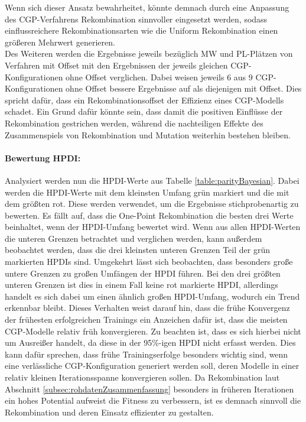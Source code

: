 Wenn sich dieser Ansatz bewahrheitet, könnte demnach durch eine Anpassung des CGP-Verfahrens Rekombination sinnvoller eingesetzt werden, sodass einflussreichere Rekombinationsarten wie die Uniform Rekombination einen größeren Mehrwert generieren.\\
Des Weiteren werden die Ergebnisse jeweils bezüglich MW und PL-Plätzen von Verfahren mit Offset mit den Ergebnissen der jeweils gleichen CGP-Konfigurationen ohne Offset verglichen.
Dabei weisen jeweils 6 aus 9 CGP-Konfigurationen ohne Offset bessere Ergebnisse auf als diejenigen mit Offset.
Dies spricht dafür, dass ein Rekombinationsoffset der Effizienz eines CGP-Modells schadet.
Ein Grund dafür könnte sein, dass damit die positiven Einflüsse der Rekombination gestrichen werden, während die nachteiligen Effekte des Zusammenspiels von Rekombination und Mutation weiterhin bestehen bleiben.
\paragraph{Bewertung HPDI:}
Analysiert werden nun die HPDI-Werte aus Tabelle \ref{table:parityBayesian}.
Dabei werden die HPDI-Werte mit dem kleinsten Umfang grün markiert und die mit dem größten rot.
Diese werden verwendet, um die Ergebnisse stichprobenartig zu bewerten.
Es fällt auf, dass die One-Point Rekombination die besten drei Werte beinhaltet, wenn der HPDI-Umfang bewertet wird.
Wenn aus allen HPDI-Werten die unteren Grenzen betrachtet und verglichen werden, kann außerdem beobachtet werden, dass die drei kleinsten unteren Grenzen Teil der grün markierten HPDIs sind.
Umgekehrt lässt sich beobachten, dass besonders große untere Grenzen zu großen Umfängen der HPDI führen.
Bei den drei größten unteren Grenzen ist dies in einem Fall keine rot markierte HPDI, allerdings handelt es sich dabei um einen ähnlich großen HPDI-Umfang, wodurch ein Trend erkennbar bleibt.
Dieses Verhalten weist darauf hin, dass die frühe Konvergenz der frühesten erfolgreichen Trainings ein Anzeichen dafür ist, dass die meisten CGP-Modelle relativ früh konvergieren.
Zu beachten ist, dass es sich hierbei nicht um Ausreißer handelt, da diese in der 95\%-igen HPDI nicht erfasst werden.
Dies kann dafür sprechen, dass frühe Trainingserfolge besonders wichtig sind, wenn eine verlässliche CGP-Konfiguration generiert werden soll, deren Modelle in einer relativ kleinen Iterationsspanne konvergieren sollen.
Da Rekombination laut Abschnitt \ref{subsec:rohdatenZusammenfassung} besonders in früheren Iterationen ein hohes Potential aufweist die Fitness zu verbessern, ist es demnach sinnvoll die Rekombination und deren Einsatz effizienter zu gestalten.

